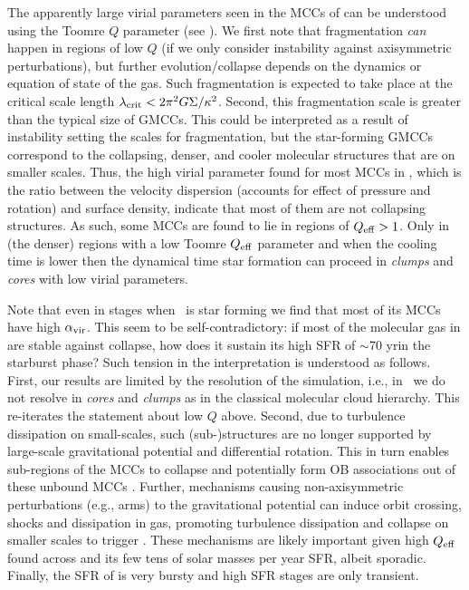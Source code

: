 \IfFileExists{emulateapjlegacy.cls}{\documentclass[iop]{emulateapjlegacy}}{\documentclass[iop]{emulateapj}}
\begin{document}
The apparently large virial parameters seen in the MCCs of \flower can be understood using the Toomre $Q$ parameter (see ). We first note that fragmentation {\it can} happen in regions of low $Q$ (if we only consider instability against axisymmetric perturbations), but further evolution/collapse depends on the dynamics or equation of state of the gas.
%
Such fragmentation is expected to take place at the critical scale length $\lambda_{\rm crit} < 2 \pi^2 G \Sigma / \kappa^2$. Second, this fragmentation scale is greater than the typical size of GMCCs. This could be interpreted as a result of instability setting the scales for fragmentation, but the star-forming GMCCs correspond to the collapsing, denser, and cooler molecular structures that are on smaller scales.
%
Thus, the high virial parameter found for most MCCs in \flower, which is the ratio between the velocity dispersion (accounts for effect of pressure and rotation) and surface density, indicate that most of them are not collapsing structures. As such, 
some MCCs are found to lie in regions of $Q_{\rm eff}>1$.
Only in (the denser) regions with a low Toomre $Q_{\rm eff}$ parameter and when the cooling time is lower then the dynamical time star formation can proceed in {\it clumps} and {\it cores} with low virial parameters.

Note that even in stages when \flower~is star forming we find that most of its MCCs have high $\alpha_{\rm vir}$. This seem to be self-contradictory: if most of the molecular gas in \flower are stable against collapse, how does it sustain its high SFR of $\sim$70\,\Msun\,yr\pmOne in the starburst phase? Such tension in the interpretation is understood as follows.
%
First, our results are limited by the resolution of the simulation, i.e., in \flower~we do not resolve \SF in {\it cores} and {\it clumps} as in the classical molecular cloud hierarchy. This re-iterates the statement about low $Q$ above.
%
Second, due to turbulence dissipation on small-scales, such (sub-)structures are no longer supported by large-scale gravitational potential and differential rotation. This in turn enables sub-regions of the MCCs to collapse and potentially form OB associations out of these unbound MCCs \citep{Clark04a, Clark05a}.
%
Further, mechanisms causing non-axisymmetric perturbations (e.g., arms) to the gravitational potential can induce orbit crossing, shocks and dissipation in gas, promoting turbulence dissipation and collapse on smaller scales to trigger \SF. These mechanisms are likely important given high $Q_{\rm eff}$ found across \flower and its few tens of solar masses per year SFR, albeit sporadic.
Finally, the SFR of \flower is very bursty and high SFR stages are only transient.
\end{document}
